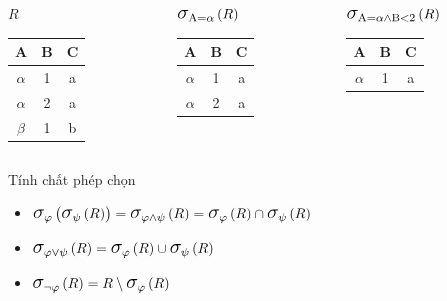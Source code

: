 \documentclass[11pt, handout]{beamer}
\newcommand{\mmm}[1]{\mathlarger{\mathlarger{\mathlarger#1}}}%
\newcommand{\psig}[2]{\mmm{\sigma}_{#1}\left(#2\right)}%
\begin{document}
  \begin{frame}
    \begin{columns}[T]
      \begin{column}{0.3\textwidth}
        \centering $R$
        \bigskip \\
        \begin{tabular}{|c|c|c|}
          \hline
          \textbf{A} & \textbf{B} & \textbf{C}  \\[0.5ex] \hline\hline
          $\alpha$ & 1 & a\\ \hline
          $\alpha$ & 2 & a\\ \hline
          $\beta$ & 1 & b\\ \hline
        \end{tabular}
      \end{column}
      \begin{column}{0.3\textwidth}
        \centering $\psig{\text{A} = \alpha}{R}$
        \medskip \\
        \begin{tabular}{|c|c|c|}
          \hline
          \textbf{A} & \textbf{B} & \textbf{C} \\[0.5ex] \hline\hline
          $\alpha$ & 1 & a\\ \hline
          $\alpha$ & 2 & a\\ \hline
        \end{tabular}
      \end{column}
      \begin{column}{0.3\textwidth}
        \centering $\psig{\text{A} = \alpha \wedge \text{B} < 2}{R}$
        \medskip \\
        \begin{tabular}{|c|c|c|}
          \hline
          \textbf{A} & \textbf{B} & \textbf{C} \\[0.5ex] \hline\hline
          $\alpha$ & 1 & a\\ \hline
        \end{tabular}
      \end{column}
    \end{columns}
  \end{frame}
  \begin{frame}{Tính chất phép chọn}
    \begin{itemize}
      \item<2-> $\psig{\varphi}{\psig{\psi}{R}} = \psig{\varphi \wedge \psi}{R} = \psig{\varphi}{R} \cap \psig{\psi}{R}$
      \item<3-> $\psig{\varphi \vee \psi}{R} = \psig{\varphi}{R} \cup \psig{\psi}{R}$
      \item<4-> $\psig{\neg \varphi}{R} = R \setminus \psig{\varphi}{R}$
    \end{itemize}
  \end{frame}
\end{document}
